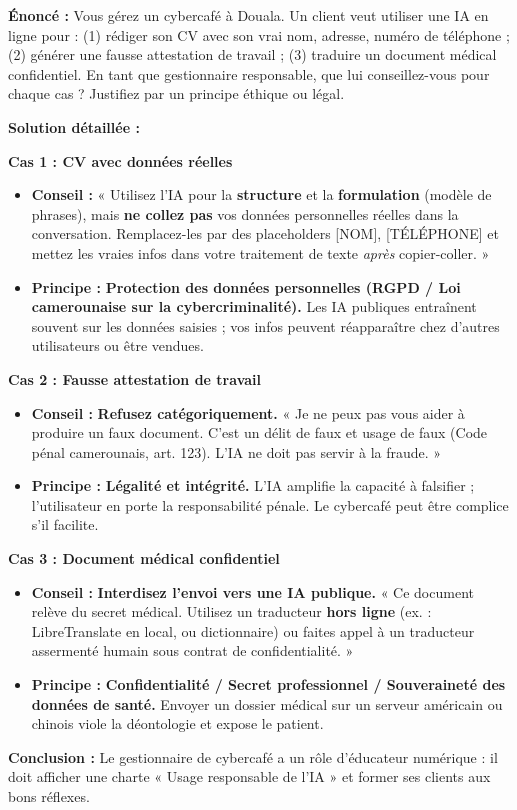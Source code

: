 \documentclass[11pt]{article}
\begin{document}
\begin{exoresolu}
\textbf{Énoncé :} Vous gérez un cybercafé à Douala. Un client veut utiliser une IA en ligne pour : (1) rédiger son CV avec son vrai nom, adresse, numéro de téléphone ; (2) générer une fausse attestation de travail ; (3) traduire un document médical confidentiel. En tant que gestionnaire responsable, que lui conseillez-vous pour chaque cas ? Justifiez par un principe éthique ou légal.

\tcblower
\textbf{Solution détaillée :}

\textbf{Cas 1 : CV avec données réelles}
\begin{itemize}
    \item \textbf{Conseil :} « Utilisez l'IA pour la \textbf{structure} et la \textbf{formulation} (modèle de phrases), mais \textbf{ne collez pas} vos données personnelles réelles dans la conversation. Remplacez-les par des placeholders [NOM], [TÉLÉPHONE] et mettez les vraies infos dans votre traitement de texte \emph{après} copier-coller. »
    \item \textbf{Principe :} \textbf{Protection des données personnelles (RGPD / Loi camerounaise sur la cybercriminalité).} Les IA publiques entraînent souvent sur les données saisies ; vos infos peuvent réapparaître chez d'autres utilisateurs ou être vendues.
\end{itemize}

\textbf{Cas 2 : Fausse attestation de travail}
\begin{itemize}
    \item \textbf{Conseil :} \textbf{Refusez catégoriquement.} « Je ne peux pas vous aider à produire un faux document. C'est un délit de faux et usage de faux (Code pénal camerounais, art. 123). L'IA ne doit pas servir à la fraude. »
    \item \textbf{Principe :} \textbf{Légalité et intégrité.} L'IA amplifie la capacité à falsifier ; l'utilisateur en porte la responsabilité pénale. Le cybercafé peut être complice s'il facilite.
\end{itemize}

\textbf{Cas 3 : Document médical confidentiel}
\begin{itemize}
    \item \textbf{Conseil :} \textbf{Interdisez l'envoi vers une IA publique.} « Ce document relève du secret médical. Utilisez un traducteur \textbf{hors ligne} (ex. : LibreTranslate en local, ou dictionnaire) ou faites appel à un traducteur assermenté humain sous contrat de confidentialité. »
    \item \textbf{Principe :} \textbf{Confidentialité / Secret professionnel / Souveraineté des données de santé.} Envoyer un dossier médical sur un serveur américain ou chinois viole la déontologie et expose le patient.
\end{itemize}

\textbf{Conclusion :} Le gestionnaire de cybercafé a un rôle d'éducateur numérique : il doit afficher une charte « Usage responsable de l'IA » et former ses clients aux bons réflexes.
\end{exoresolu}
\end{document}
